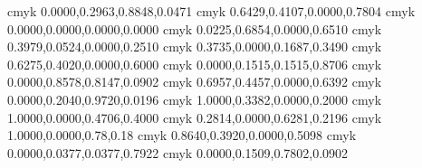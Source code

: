 
\definecolor{cf3ab1c} {cmyk} {0.0000,0.2963,0.8848,0.0471}
\definecolor{c142138} {cmyk} {0.6429,0.4107,0.0000,0.7804}
\definecolor{cffffff} {cmyk} {0.0000,0.0000,0.0000,0.0000}
\definecolor{c571c59} {cmyk} {0.0225,0.6854,0.0000,0.6510}
\definecolor{c73b5bf} {cmyk} {0.3979,0.0524,0.0000,0.2510}
\definecolor{c68a68a} {cmyk} {0.3735,0.0000,0.1687,0.3490}
\definecolor{c263d66} {cmyk} {0.6275,0.4020,0.0000,0.6000}
\definecolor{c211c1c} {cmyk} {0.0000,0.1515,0.1515,0.8706}
\definecolor{ce8212b} {cmyk} {0.0000,0.8578,0.8147,0.0902}
\definecolor{c1c335c} {cmyk} {0.6957,0.4457,0.0000,0.6392}
\definecolor{cfac707} {cmyk} {0.0000,0.2040,0.9720,0.0196}
\definecolor{c0087cc} {cmyk} {1.0000,0.3382,0.0000,0.2000}
\definecolor{c009951} {cmyk} {1.0000,0.0000,0.4706,0.4000}
\definecolor{c8fc74a} {cmyk} {0.2814,0.0000,0.6281,0.2196}
\definecolor{c009e51} {cmyk} {1.0000,0.0000,0.78,0.18} %
\definecolor{c114c7d} {cmyk} {0.8640,0.3920,0.0000,0.5098}
\definecolor{c353333} {cmyk} {0.0000,0.0377,0.0377,0.7922}
\definecolor{ce8c533} {cmyk} {0.0000,0.1509,0.7802,0.0902}

